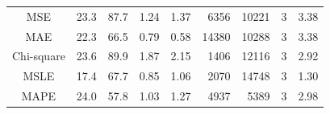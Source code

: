 {\begin{landscape}
\begin{table}[]
\begin{tabular}{crrrrrrrr}
MSE   & 23.3    & 87.7    & 1.24    & 1.37   & 6356  & 10221   & 3  & 3.38     \\
MAE  & 22.3   & 66.5  & 0.79     & 0.58   & 14380  & 10288    & 3    & 3.38    \\
Chi-square    & 23.6   & 89.9  & 1.87   & 2.15  & 1406   & 12116  & 3  & 2.92  \\ 
MSLE   & 17.4   & 67.7   & 0.85   & 1.06   & 2070   & 14748  & 3   & 1.30   \\
MAPE   & 24.0  & 57.8   & 1.03    & 1.27    & 4937    & 5389   & 3  & 2.98  \\ \hline
\end{tabular}
\end{table}
\end{landscape}
\clearpage%
}

\afterpage{%
    \clearpage%
    \begin{landscape}%


\end{landscape}}
